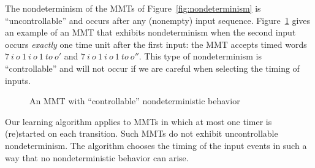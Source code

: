 \fi
%
The nondeterminism of the MMTs of Figure~\ref{fig:nondeterminism} 
is ``uncontrollable'' and occurs after any (nonempty) input sequence.
Figure~\ref{fig:nondeterminism3} gives an example of an MMT that exhibits nondeterminism when the second input occurs \emph{exactly} one time unit after the first input: the MMT accepts timed words
$7 ~ i ~ o ~ 1 ~ i ~ o ~ 1 ~ \mathit{to} ~ o'$ and $7 ~ i ~ o ~ 1 ~ i ~ o ~ 1 ~ \mathit{to} ~ o''$.
This type of nondeterminism is ``controllable'' and will not occur if we are careful
when selecting the timing of inputs.
\begin{figure}[ht]
\vspace{-2em}
\begin{center}
\caption{An MMT with ``controllable'' nondeterministic behavior}
\label{fig:nondeterminism3}
\end{center}
\end{figure}
\iflong
Our learning algorithm applies to MMTs in which at most one timer is (re)started on each transition. Such MMTs do not
exhibit uncontrollable nondeterminism. The algorithm chooses the timing of the input events in such a way that no
nondeterministic behavior can arise.
\fi

